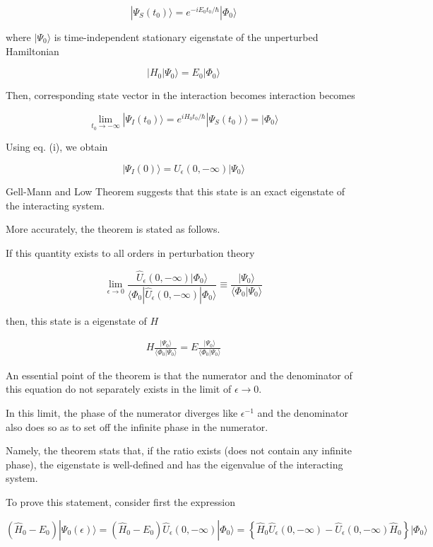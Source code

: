 \[|\Psi_S(t_0)\rangle = e^{-i E_0 t_0/\hbar}|\Phi_0\rangle \]

where $|\Psi_0\rangle$ is time-independent stationary eigenstate of the unperturbed Hamiltonian

\[|H_0|\Psi_0\rangle = E_0|\Phi_0\rangle\]

Then, corresponding state vector in the interaction becomes interaction becomes 

\[\lim_{t_0\to-\infty}|\Psi_I(t_0)\rangle = e^{i H_0t_0/\hbar}|\Psi_S(t_0)\rangle = |\Phi_0\rangle \]

Using eq. (i), we obtain

\[|\Psi_I(0)\rangle = U_\epsilon (0,-\infty)|\Psi_0\rangle \]

Gell-Mann and Low Theorem suggests that this state is an exact eigenstate of the interacting system. 

More accurately, the theorem is stated as follows. 

If this quantity exists to all orders in perturbation theory

\[\lim_{\epsilon\to0}\frac{\hat{U}_\epsilon(0,-\infty)|\Phi_0\rangle}{\langle\Phi_0|\hat{U}_\epsilon(0,-\infty)|\Phi_0\rangle} \equiv \frac{|\Psi_0\rangle}{\langle\Phi_0|\Psi_0\rangle} \]

then, this state is a eigenstate of $H$

\begin{align}
H\frac{|\Psi_0\rangle}{\langle\Phi_0|\Psi_0\rangle} = E\frac{|\Psi_0\rangle}{\langle\Phi_0|\Psi_0\rangle}
\end{align}

An essential point of the theorem is that the numerator and the denominator of this equation do not separately exists in the limit of $\epsilon\to0$. 

In this limit, the phase of the numerator diverges like $\epsilon^{-1}$ and the denominator also does so as to set off the infinite phase in the numerator. 

Namely, the theorem stats that, if the ratio exists (does not contain any infinite phase), the eigenstate is well-defined and has the eigenvalue of the interacting system. 

To prove this statement, consider first the expression

\[(\hat{H}_0-E_0)|\Psi_0(\epsilon)\rangle = (\hat{H}_0-E_0)\hat{U}_\epsilon(0,-\infty)|\Phi_0\rangle = \left\{\hat{H}_0\hat{U}_\epsilon(0,-\infty)-\hat{U}_\epsilon(0,-\infty)\hat{H}_0\right\}|\Phi_0\rangle \]

